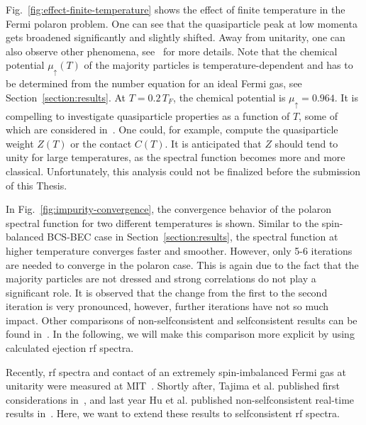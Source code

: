 Fig.~\ref{fig:effect-finite-temperature} shows the effect of finite temperature in the Fermi polaron problem. One can see that the quasiparticle peak at low momenta gets broadened significantly and slightly shifted. Away from unitarity, one can also observe other phenomena, see~\cite{Hu2022} for more details. Note that the chemical potential $\mu_{\uparrow}(T)$ of the majority particles is temperature-dependent and has to be determined from the number equation for an ideal Fermi gas, see Section~\ref{section:results}. At $T=0.2\,T_F$, the chemical potential is $\mu_{\uparrow}=0.964$. It is compelling to investigate quasiparticle properties as a function of $T$, some of which are considered in~\cite{Hu2022}. One could, for example, compute the quasiparticle weight $Z(T)$ or the contact $C(T)$. It is anticipated that $Z$ should tend to unity for large temperatures, as the spectral function becomes more and more classical. Unfortunately, this analysis could not be finalized before the submission of this Thesis.

In Fig.~\ref{fig:impurity-convergence}, the convergence behavior of the polaron spectral function for two different temperatures is shown. Similar to the spin-balanced BCS-BEC case in Section~\ref{section:results}, the spectral function at higher temperature converges faster and smoother. However, only 5-6 iterations are needed to converge in the polaron case. This is again due to the fact that the majority particles are not dressed and strong correlations do not play a significant role. It is observed that the change from the first to the second iteration is very pronounced, however, further iterations have not so much impact. Other comparisons of non-selfconsistent and selfconsistent results can be found in~\cite{Chien2010,Hu2008,Tajima2021}. In the following, we will make this comparison more explicit by using calculated ejection rf spectra.

Recently, rf spectra and contact of an extremely spin-imbalanced Fermi gas at unitarity were measured at MIT~\cite{Yan2019}. Shortly after, Tajima et al. published first considerations in~\cite{Tajima2019}, and last year Hu et al. published non-selfconsistent real-time results in~\cite{Hu2022}. Here, we want to extend these results to selfconsistent rf spectra.

